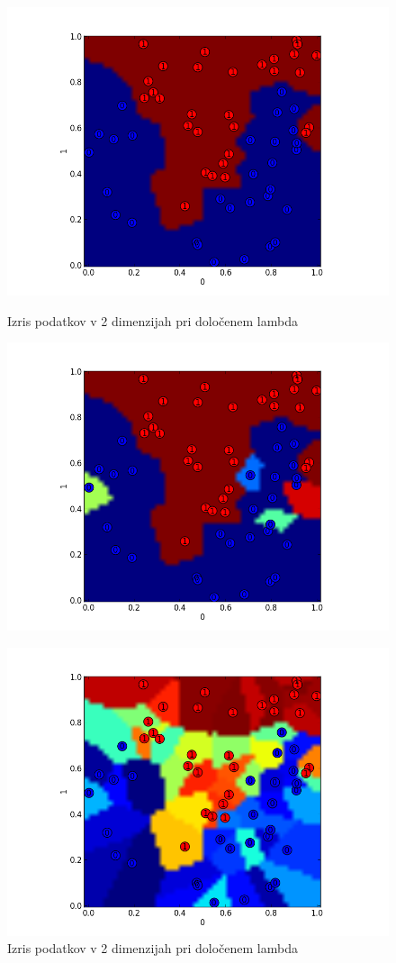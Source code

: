 \documentclass[a4paper,11pt]{article}
\begin{document}
\begin{figure}[htbp]
\begin{center}
\includegraphics[scale=0.3]{fig1.png}
\caption{Izris podatkov v 2 dimenzijah pri določenem lambda}
\label{slika1}
\includegraphics[scale=0.3]{fig3.png}
\caption{Izris podatkov v 2 dimenzijah pri določenem lambda}
\label{slika2}
\includegraphics[scale=0.3]{fig2.png}

\end{center}
\end{figure}
\end{document}

